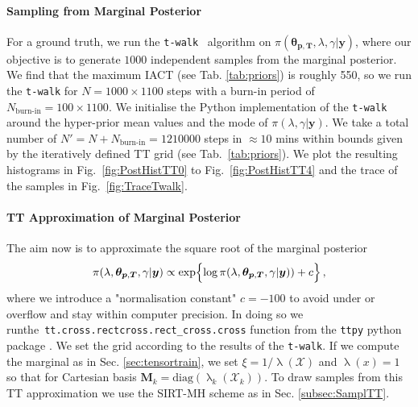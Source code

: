 \paragraph{Sampling from Marginal Posterior}
For a ground truth, we run the \texttt{t-walk}~\cite{christen2010general} algorithm on $\pi( \bm{\theta}_{\bm{p}, \bm{T}},\lambda,\gamma  | \bm{y})$, where our objective is to generate $1000$ independent samples from the marginal posterior.
We find that the maximum IACT (see Tab. \ref{tab:priors}) is roughly  550, so we run the \texttt{t-walk} for $N = 1000 \times 1100$ steps with a burn-in period of $N_{\text{burn-in}} = 100 \times 1100 $.
We initialise the Python implementation of the \texttt{t-walk}~\cite{christentwalkaccess} around the hyper-prior mean values and the mode of $\pi(\lambda ,\gamma|\bm{y})$.
We take a total number of $N' =N + N_{\text{burn-in}} = 1210000$ steps in $\approx 10$ mins within bounds given by the iteratively defined TT grid (see Tab.~\ref{tab:priors}).
We plot the resulting histograms in Fig.~\ref{fig:PostHistTT0} to Fig.~\ref{fig:PostHistTT4} and the trace of the samples in Fig.~\ref{fig:TraceTwalk}.

\paragraph{TT Approximation of Marginal Posterior}
The aim now is to approximate the square root of the marginal posterior
\begin{align}
	\begin{split}
		\pi( \lambda,\bm{\theta}_{\bm{p}, \bm{T}},\gamma  | \bm{y}) \propto  \exp\Bigl\{\log{\pi( \lambda,\bm{\theta}_{\bm{p}, \bm{T}},\gamma  | \bm{y}) ) } + c \Bigr\}  
	\end{split} \, ,
	\label{eq:MargPostFullTT}
\end{align}
where we introduce a "normalisation constant" $c=-100$ to avoid under or overflow and stay within computer precision.
In doing so we run\linebreak the~\texttt{tt.cross.rectcross.rect\_cross.cross} function from the \texttt{ttpy} python package \cite{Oseledets2018ttpy}.
We set the grid according to the results of the \texttt{t-walk}.
If we compute the marginal as in Sec. \ref{sec:tensortrain}, we set $\xi = 1 / \uplambda (\mathcal{X})$ and $\uplambda(x) = 1$ so that for Cartesian basis $\bm{M}_k = \text{diag}(\uplambda_k(\mathcal{X}_k))$.
To draw samples from this TT approximation we use the SIRT-MH scheme as in Sec. \ref{subsec:SamplTT}.



